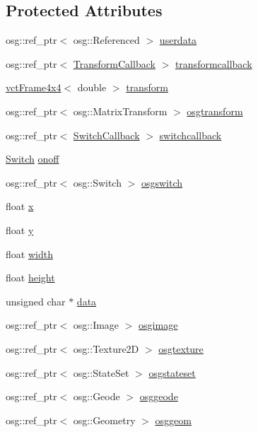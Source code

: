 \subsection*{Protected Attributes}
\begin{DoxyCompactItemize}
\item 
osg\+::ref\+\_\+ptr$<$ osg\+::\+Referenced $>$ \hyperlink{classosa_o_s_g_image_a612dc68e1eccf9b96a8d2a2976a2d2de}{userdata}
\item 
osg\+::ref\+\_\+ptr$<$ \hyperlink{classosa_o_s_g_image_1_1_transform_callback}{Transform\+Callback} $>$ \hyperlink{classosa_o_s_g_image_a0f94bfe9322fe3d40a09706398f558f4}{transformcallback}
\item 
\hyperlink{classvct_frame4x4}{vct\+Frame4x4}$<$ double $>$ \hyperlink{classosa_o_s_g_image_a995c45a06441301f3a8845bc67621b89}{transform}
\item 
osg\+::ref\+\_\+ptr$<$ osg\+::\+Matrix\+Transform $>$ \hyperlink{classosa_o_s_g_image_ad1e17d08490c1a071a136779a6cff1ab}{osgtransform}
\item 
osg\+::ref\+\_\+ptr$<$ \hyperlink{classosa_o_s_g_image_1_1_switch_callback}{Switch\+Callback} $>$ \hyperlink{classosa_o_s_g_image_a497dd33a14a175166968cb9509c87a73}{switchcallback}
\item 
\hyperlink{classosa_o_s_g_image_a2da87cd46b5af72c4a2d1b1a97122d01}{Switch} \hyperlink{classosa_o_s_g_image_afa4051f9cb78f98370739416e7411854}{onoff}
\item 
osg\+::ref\+\_\+ptr$<$ osg\+::\+Switch $>$ \hyperlink{classosa_o_s_g_image_ae0c39af6fbb02f9cecd27d9c464c43a5}{osgswitch}
\item 
float \hyperlink{classosa_o_s_g_image_a44d3e5d8face9e82282a356e4c4c3332}{x}
\item 
float \hyperlink{classosa_o_s_g_image_a6bee81116bbd53706ad648f61b74fc64}{y}
\item 
float \hyperlink{classosa_o_s_g_image_a9ba055113d2bcc4ec78db305f16fef4d}{width}
\item 
float \hyperlink{classosa_o_s_g_image_aaec6b37a20e1855336360b1825f7b4a6}{height}
\item 
unsigned char $\ast$ \hyperlink{classosa_o_s_g_image_a597695a8798c7a8cb89327da377dc679}{data}
\item 
osg\+::ref\+\_\+ptr$<$ osg\+::\+Image $>$ \hyperlink{classosa_o_s_g_image_a5ef367c2bc37b1fb525084a85ceb0142}{osgimage}
\item 
osg\+::ref\+\_\+ptr$<$ osg\+::\+Texture2\+D $>$ \hyperlink{classosa_o_s_g_image_aecdf8d95b41d0fd16155d38572394924}{osgtexture}
\item 
osg\+::ref\+\_\+ptr$<$ osg\+::\+State\+Set $>$ \hyperlink{classosa_o_s_g_image_a67af38cab8be5f535eebd267813e0958}{osgstateset}
\item 
osg\+::ref\+\_\+ptr$<$ osg\+::\+Geode $>$ \hyperlink{classosa_o_s_g_image_a972cf8e8088d4fa639c0b7f17dbc3344}{osggeode}
\item 
osg\+::ref\+\_\+ptr$<$ osg\+::\+Geometry $>$ \hyperlink{classosa_o_s_g_image_abfb175fcab2334aa3bd8c32fb49f0f23}{osggeom}
\end{DoxyCompactItemize}


